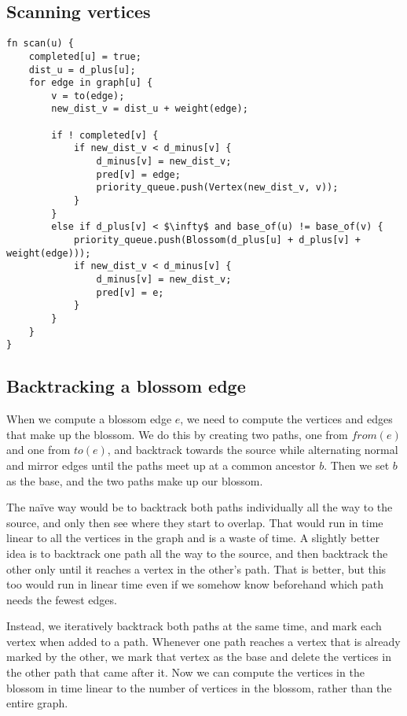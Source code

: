 \subsection{Scanning vertices}
\begin{lstlisting}[caption={Scan},label=Listing,mathescape=true]
fn scan(u) {
    completed[u] = true;
    dist_u = d_plus[u];
    for edge in graph[u] {
        v = to(edge);
        new_dist_v = dist_u + weight(edge);

        if ! completed[v] {
            if new_dist_v < d_minus[v] {
                d_minus[v] = new_dist_v;
                pred[v] = edge;
                priority_queue.push(Vertex(new_dist_v, v));
            }
        }
        else if d_plus[v] < $\infty$ and base_of(u) != base_of(v) {
            priority_queue.push(Blossom(d_plus[u] + d_plus[v] + weight(edge)));
            if new_dist_v < d_minus[v] {
                d_minus[v] = new_dist_v;
                pred[v] = e;
            }
        }
    }
}
\end{lstlisting}

\subsection{Backtracking a blossom edge}
\label{subsection:backtracking-blossom-edges}
When we compute a blossom edge $e$, we need to compute the vertices and edges that make up the blossom. We do this by creating two paths, one from $from(e)$ and one from $to(e)$, and backtrack towards the source while alternating normal and mirror edges until the paths meet up at a common ancestor $b$. Then we set $b$ as the base, and the two paths make up our blossom.

The naïve way would be to backtrack both paths individually all the way to the source, and only then see where they start to overlap. That would run in time linear to all the vertices in the graph and is a waste of time. A slightly better idea is to backtrack one path all the way to the source, and then backtrack the other only until it reaches a vertex in the other's path. That is better, but this too would run in linear time even if we somehow know beforehand which path needs the fewest edges.

Instead, we iteratively backtrack both paths at the same time, and mark each vertex when added to a path. Whenever one path reaches a vertex that is already marked by the other, we mark that vertex as the base and delete the vertices in the other path that came after it. Now we can compute the vertices in the blossom in time linear to the number of vertices in the blossom, rather than the entire graph.

